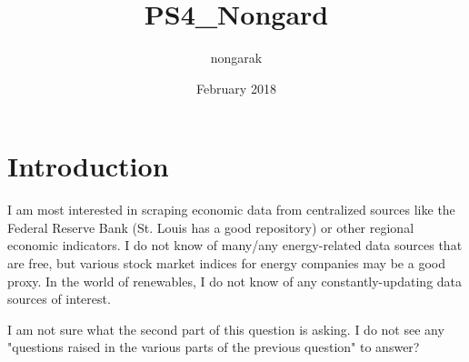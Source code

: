 \documentclass{article}
\title{PS4_Nongard}
\author{nongarak }
\date{February 2018}
\begin{document}
\maketitle

\section{Introduction}
I am most interested in scraping economic data from centralized sources like the Federal Reserve Bank (St. Louis has a good repository) or other regional economic indicators. I do not know of many/any energy-related data sources that are free, but various stock market indices for energy companies may be a good proxy. In the world of renewables, I do not know of any constantly-updating data sources of interest. 

I am not sure what the second part of this question is asking. I do not see any "questions raised in the various parts of the previous question" to answer? 
\end{document}
